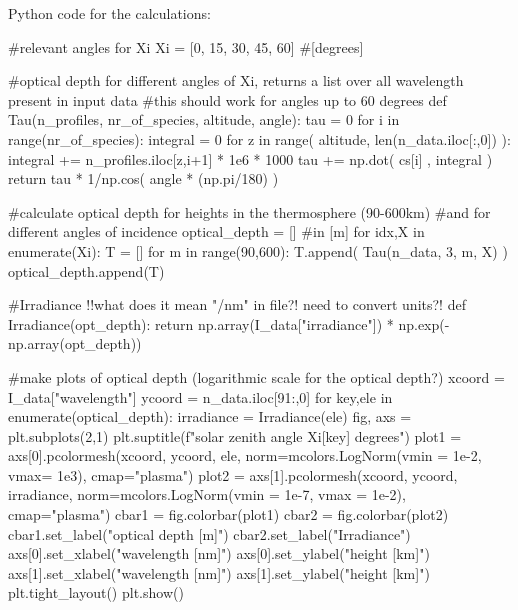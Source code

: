 \documentclass[a4paper, 12pt]{article}
\begin{document}
Python code for the calculations:
\begin{python}
#relevant angles for Xi
Xi = [0, 15, 30, 45, 60] #[degrees]

#optical depth for different angles of Xi, returns a list over all wavelength present in input data
#this should work for angles up to 60 degrees
def Tau(n_profiles, nr_of_species, altitude, angle):
    tau = 0
    for i in range(nr_of_species):
        integral = 0
        for z in range( altitude, len(n_data.iloc[:,0]) ):
            integral += n_profiles.iloc[z,i+1] * 1e6 * 1000
        tau += np.dot( cs[i] , integral )
    return tau * 1/np.cos( angle * (np.pi/180) )

#calculate optical depth for heights in the thermosphere (90-600km)
#and for different angles of incidence
optical_depth = [] #in [m]
for idx,X in enumerate(Xi):
    T = []
    for m in range(90,600):
        T.append( Tau(n_data, 3, m, X) )
    optical_depth.append(T)

#Irradiance !!what does it mean "/nm" in file?! need to convert units?!
def Irradiance(opt_depth):
    return np.array(I_data["irradiance"]) * np.exp(-np.array(opt_depth))


#make plots of optical depth (logarithmic scale for the optical depth?)
xcoord = I_data["wavelength"]
ycoord = n_data.iloc[91:,0]
for key,ele in enumerate(optical_depth):
    irradiance = Irradiance(ele)
    fig, axs = plt.subplots(2,1)
    plt.suptitle(f"solar zenith angle {Xi[key]} degrees")
    plot1 = axs[0].pcolormesh(xcoord, ycoord, ele, norm=mcolors.LogNorm(vmin = 1e-2, vmax= 1e3), cmap="plasma")
    plot2 = axs[1].pcolormesh(xcoord, ycoord, irradiance, norm=mcolors.LogNorm(vmin = 1e-7, vmax = 1e-2), cmap="plasma")
    cbar1 = fig.colorbar(plot1)
    cbar2 = fig.colorbar(plot2)
    cbar1.set_label("optical depth [m]")
    cbar2.set_label("Irradiance")
    axs[0].set_xlabel("wavelength [nm]")
    axs[0].set_ylabel("height [km]")
    axs[1].set_xlabel("wavelength [nm]")
    axs[1].set_ylabel("height [km]")
    plt.tight_layout()
    plt.show()
\end{python}
\end{document}
